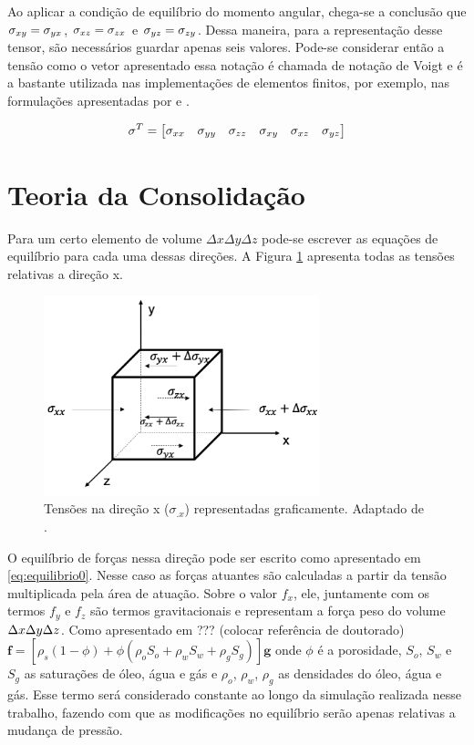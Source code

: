 Ao aplicar a condição de equilíbrio do momento angular, chega-se a conclusão que $\sigma_{xy}=\sigma_{yx}$, $\sigma_{xz}=\sigma_{zx}$ e $\sigma_{yz}=\sigma_{zy}$. Dessa maneira, para a representação desse tensor, são necessários guardar apenas seis valores. Pode-se considerar então a tensão como o vetor apresentado \label{eq:tensor6} essa notação é chamada de notação de Voigt e é a bastante utilizada nas implementações de elementos finitos, por exemplo, nas formulações apresentadas por \cite{hughes} e \cite{jacob}.


\begin{equation}
\sigma^T = \begin{bmatrix}
\sigma_{xx} & \sigma_{yy} & \sigma_{zz} & \sigma_{xy} & \sigma_{xz} & \sigma_{yz}
\end{bmatrix}
\label{eq:tensor6}
\end{equation}


\section{Teoria da Consolidação}

Para um certo elemento de volume $\Delta x\Delta y \Delta z$ pode-se escrever as equações de equilíbrio para cada uma dessas direções. A Figura \ref{fig:equilibrio} apresenta todas as tensões relativas a direção x.

\begin{figure}[!htbp]
\centering
\includegraphics[width=8cm]{chap01/figs/equilibrio.png}
\caption{Tensões na direção x ($\sigma_{.x}$) representadas graficamente.  Adaptado de \cite{CompGeomec}.}
\label{fig:equilibrio}
\end{figure}

O equilíbrio de forças nessa direção pode ser escrito como apresentado em \eqref{eq:equilibrio0}. Nesse caso as forças atuantes são calculadas a partir da tensão multiplicada pela área de atuação. Sobre o valor $f_x$, ele, juntamente com os termos $f_y$ e $f_z$  são termos gravitacionais e representam a força peso do volume $\Delta x\Delta y\Delta z$. Como apresentado em ??? (colocar referência de doutorado) $\mathbf{f} = [\rho_s(1-\phi) + \phi(\rho_o S_o + \rho_w S_w + \rho_g S_g )] \mathbf{g}$ onde $\phi$ é a porosidade, $S_o$, $S_w$ e $S_g$ as saturações de óleo, água e gás e $\rho_o$, $\rho_w$, $\rho_g$  as densidades do óleo, água e gás. Esse termo será considerado constante ao longo da simulação realizada nesse trabalho, fazendo com que as modificações no equilíbrio serão apenas relativas a mudança de pressão.


